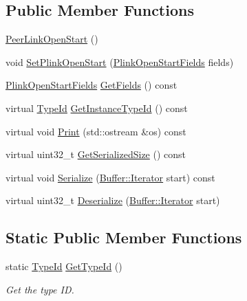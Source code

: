 \subsection*{Public Member Functions}
\begin{DoxyCompactItemize}
\item 
\hyperlink{classns3_1_1dot11s_1_1PeerLinkOpenStart_acaeb035791339568b046744757f9d1b7}{Peer\+Link\+Open\+Start} ()
\item 
void \hyperlink{classns3_1_1dot11s_1_1PeerLinkOpenStart_a714f460c174567335458883ca229bae7}{Set\+Plink\+Open\+Start} (\hyperlink{structns3_1_1dot11s_1_1PeerLinkOpenStart_1_1PlinkOpenStartFields}{Plink\+Open\+Start\+Fields} fields)
\item 
\hyperlink{structns3_1_1dot11s_1_1PeerLinkOpenStart_1_1PlinkOpenStartFields}{Plink\+Open\+Start\+Fields} \hyperlink{classns3_1_1dot11s_1_1PeerLinkOpenStart_ac3e040a1cfd4bdd2f4d7aa9d596f3c50}{Get\+Fields} () const 
\item 
virtual \hyperlink{classns3_1_1TypeId}{Type\+Id} \hyperlink{classns3_1_1dot11s_1_1PeerLinkOpenStart_a746174cf648078302b6bcbdae22cc606}{Get\+Instance\+Type\+Id} () const 
\item 
virtual void \hyperlink{classns3_1_1dot11s_1_1PeerLinkOpenStart_a3c932b3ccf1b63a44775ffa7364352be}{Print} (std\+::ostream \&os) const 
\item 
virtual uint32\+\_\+t \hyperlink{classns3_1_1dot11s_1_1PeerLinkOpenStart_a2050a3dd6782b967ae1622b7eed979ef}{Get\+Serialized\+Size} () const 
\item 
virtual void \hyperlink{classns3_1_1dot11s_1_1PeerLinkOpenStart_a1c115bceee658219bbcd1730f1ff07a4}{Serialize} (\hyperlink{classns3_1_1Buffer_1_1Iterator}{Buffer\+::\+Iterator} start) const 
\item 
virtual uint32\+\_\+t \hyperlink{classns3_1_1dot11s_1_1PeerLinkOpenStart_a315473be0f383a55415b452b45f688bb}{Deserialize} (\hyperlink{classns3_1_1Buffer_1_1Iterator}{Buffer\+::\+Iterator} start)
\end{DoxyCompactItemize}
\subsection*{Static Public Member Functions}
\begin{DoxyCompactItemize}
\item 
static \hyperlink{classns3_1_1TypeId}{Type\+Id} \hyperlink{classns3_1_1dot11s_1_1PeerLinkOpenStart_a2dfaea4bb0306b95b5481a744b15e392}{Get\+Type\+Id} ()
\begin{DoxyCompactList}\small\item\em Get the type ID. \end{DoxyCompactList}\end{DoxyCompactItemize}
